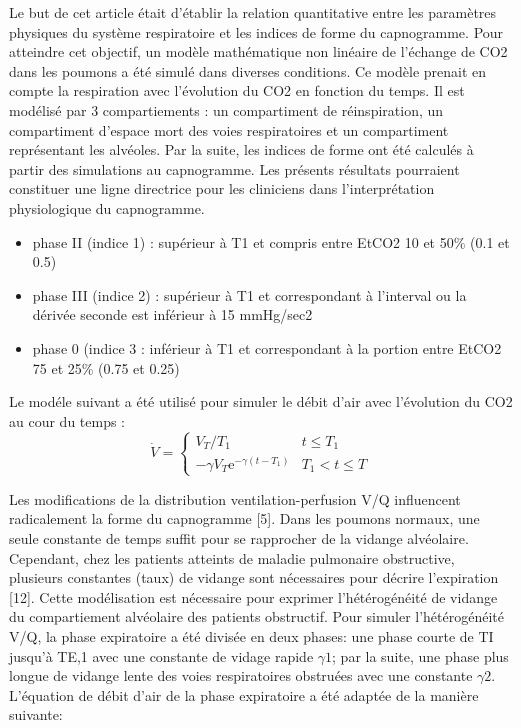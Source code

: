 \documentclass[12pt,]{article}
\providecommand{\tightlist}{%
  \setlength{\itemsep}{0pt}\setlength{\parskip}{0pt}}
\begin{document}
Le but de cet article était d'établir la relation quantitative entre les
paramètres physiques du système respiratoire et les indices de forme du
capnogramme. Pour atteindre cet objectif, un modèle mathématique non
linéaire de l'échange de CO2 dans les poumons a été simulé dans diverses
conditions. Ce modèle prenait en compte la respiration avec l'évolution
du CO2 en fonction du temps. Il est modélisé par 3 compartiements : un
compartiment de réinspiration, un compartiment d'espace mort des voies
respiratoires et un compartiment représentant les alvéoles. Par la
suite, les indices de forme ont été calculés à partir des simulations au
capnogramme. Les présents résultats pourraient constituer une ligne
directrice pour les cliniciens dans l'interprétation physiologique du
capnogramme.

\begin{itemize}
\tightlist
\item
  phase II (indice 1) : supérieur à T1 et compris entre EtCO2 10 et 50\%
  (0.1 et 0.5)
\item
  phase III (indice 2) : supérieur à T1 et correspondant à l'interval ou
  la dérivée seconde est inférieur à 15 mmHg/sec2
\item
  phase 0 (indice 3 : inférieur à T1 et correspondant à la portion entre
  EtCO2 75 et 25\% (0.75 et 0.25)
\end{itemize}

Le modéle suivant a été utilisé pour simuler le débit d'air avec
l'évolution du CO2 au cour du temps : \[ 
 \dot{V} =     \left\{ \begin{array}{rcl}
         V_{T}/T_{1} & t\leqslant T_{1}
         \\ -\gamma V_{T}\mathrm{e}^{-\gamma(t-T_{1})} & T_{1}<t\leqslant T
                \end{array}\right.
\]

Les modifications de la distribution ventilation-perfusion V/Q
influencent radicalement la forme du capnogramme {[}5{]}. Dans les
poumons normaux, une seule constante de temps suffit pour se rapprocher
de la vidange alvéolaire. Cependant, chez les patients atteints de
maladie pulmonaire obstructive, plusieurs constantes (taux) de vidange
sont nécessaires pour décrire l'expiration {[}12{]}. Cette modélisation
est nécessaire pour exprimer l'hétérogénéité de vidange du compartiement
alvéolaire des patients obstructif. Pour simuler l'hétérogénéité V/Q, la
phase expiratoire a été divisée en deux phases: une phase courte de TI
jusqu'à TE,1 avec une constante de vidage rapide \(\gamma1\); par la
suite, une phase plus longue de vidange lente des voies respiratoires
obstruées avec une constante \(\gamma2\). L'équation de débit d'air de
la phase expiratoire a été adaptée de la manière suivante:
\end{document}
